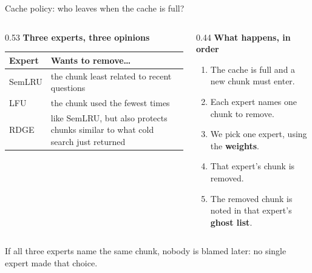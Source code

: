\documentclass[aspectratio=169,11pt]{beamer}
\begin{document}
\begin{frame}{Cache policy: who leaves when the cache is full?}
\begin{columns}[T,onlytextwidth]
\begin{column}{0.53\textwidth}
\small
\textbf{Three experts, three opinions}\\[3pt]
\begin{tabular}{@{}lp{5.2cm}@{}}
\toprule
\textbf{Expert} & \textbf{Wants to remove\ldots} \\
\midrule
SemLRU & the chunk least related to recent questions \\
LFU    & the chunk used the fewest times \\
RDGE   & like SemLRU, but also protects chunks similar to what cold
         search just returned \\
\bottomrule
\end{tabular}
\end{column}
\begin{column}{0.44\textwidth}
\small
\textbf{What happens, in order}
\begin{enumerate}
  \setlength{\itemsep}{2pt}
  \item The cache is full and a new chunk must enter.
  \item Each expert names one chunk to remove.
  \item We pick one expert, using the \textbf{weights}.
  \item That expert's chunk is removed.
  \item The removed chunk is noted in that expert's \textbf{ghost list}.
\end{enumerate}
\end{column}
\end{columns}
\vspace{8pt}
{\small\color{cmgrey}
If all three experts name the same chunk, nobody is blamed later: no
single expert made that choice.\par}
\end{frame}
\end{document}
